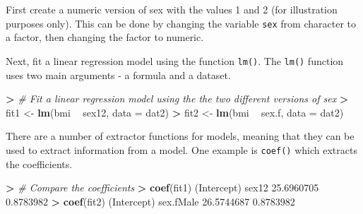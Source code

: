 \documentclass[
]{book}
\newenvironment{Shaded}{\begin{snugshade}}{\end{snugshade}}
\newcommand{\CommentTok}[1]{\textcolor[rgb]{0.56,0.35,0.01}{\textit{#1}}}
\newcommand{\DataTypeTok}[1]{\textcolor[rgb]{0.13,0.29,0.53}{#1}}
\newcommand{\DecValTok}[1]{\textcolor[rgb]{0.00,0.00,0.81}{#1}}
\newcommand{\ErrorTok}[1]{\textcolor[rgb]{0.64,0.00,0.00}{\textbf{#1}}}
\newcommand{\FloatTok}[1]{\textcolor[rgb]{0.00,0.00,0.81}{#1}}
\newcommand{\KeywordTok}[1]{\textcolor[rgb]{0.13,0.29,0.53}{\textbf{#1}}}
\newcommand{\NormalTok}[1]{#1}
\newcommand{\OperatorTok}[1]{\textcolor[rgb]{0.81,0.36,0.00}{\textbf{#1}}}
\newcommand{\StringTok}[1]{\textcolor[rgb]{0.31,0.60,0.02}{#1}}
\begin{document}
First create a numeric version of sex with the values 1 and 2 (for illustration purposes only). This can be done by changing the variable \texttt{sex} from character to a factor, then changing the factor to numeric.

\begin{Shaded}
\end{Shaded}

Next, fit a linear regression model using the function \texttt{lm()}. The \texttt{lm()} function uses two main arguments - a formula and a dataset.

\begin{Shaded}
\begin{Highlighting}[]
\OperatorTok{>}\StringTok{ }\CommentTok{# Fit a linear regression model using the the two different versions of sex}
\ErrorTok{>}\StringTok{ }\NormalTok{fit1 <-}\StringTok{ }\KeywordTok{lm}\NormalTok{(bmi }\OperatorTok{~}\StringTok{ }\NormalTok{sex12, }\DataTypeTok{data =}\NormalTok{ dat2)}
\OperatorTok{>}\StringTok{ }\NormalTok{fit2 <-}\StringTok{ }\KeywordTok{lm}\NormalTok{(bmi }\OperatorTok{~}\StringTok{ }\NormalTok{sex.f, }\DataTypeTok{data =}\NormalTok{ dat2)}
\end{Highlighting}
\end{Shaded}

There are a number of extractor functions for models, meaning that they can be used to extract information from a model. One example is \texttt{coef()} which extracts the coefficients.

\begin{Shaded}
\begin{Highlighting}[]
\OperatorTok{>}\StringTok{ }\CommentTok{# Compare the coefficients}
\ErrorTok{>}\StringTok{ }\KeywordTok{coef}\NormalTok{(fit1)}
\NormalTok{(Intercept)       sex12 }
 \FloatTok{25.6960705}   \FloatTok{0.8783982} 
\OperatorTok{>}\StringTok{ }\KeywordTok{coef}\NormalTok{(fit2)}
\NormalTok{(Intercept)   sex.fMale }
 \FloatTok{26.5744687}   \FloatTok{0.8783982} 
\end{Highlighting}
\end{Shaded}
\end{document}
